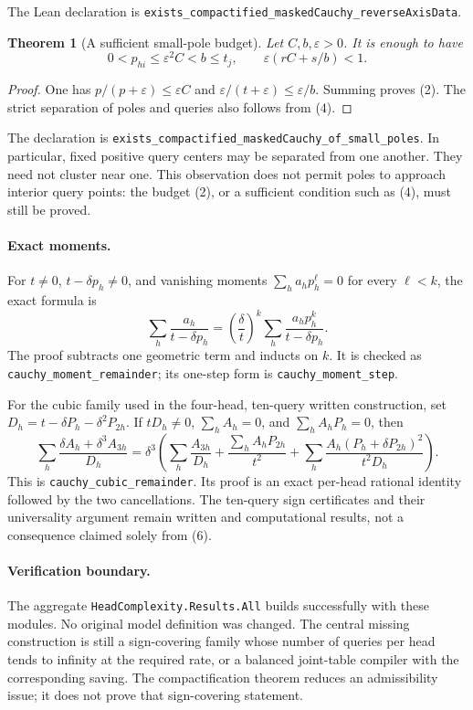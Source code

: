 \documentclass[11pt]{article}
\newtheorem{theorem}{Theorem}
\begin{document}
The Lean declaration is
\texttt{exists\_compactified\_maskedCauchy\_reverseAxisData}.

\begin{theorem}[A sufficient small-pole budget]
Let $C,b,\varepsilon>0$. It is enough to have
\[
 0<p_{hi}\leq\varepsilon^2 C<b\leq t_j,
 \qquad \varepsilon(rC+s/b)<1.
 \tag{4}
\]
\end{theorem}
\begin{proof}
One has $p/(p+\varepsilon)\leq\varepsilon C$ and
$\varepsilon/(t+\varepsilon)\leq\varepsilon/b$.
Summing proves (2). The strict separation of poles and queries also
follows from (4).
\end{proof}
The declaration is
\texttt{exists\_compactified\_maskedCauchy\_of\_small\_poles}.
In particular, fixed positive query centers may be separated from
one another. They need not cluster near one. This observation does
not permit poles to approach interior query points: the budget
(2), or a sufficient condition such as (4), must still be proved.

\paragraph{Exact moments.}
For $t\neq0$, $t-\delta p_h\neq0$, and vanishing moments
$\sum_h a_hp_h^\ell=0$ for every $\ell<k$, the exact formula is
\[
 \sum_h\frac{a_h}{t-\delta p_h}
 =\left(\frac\delta t\right)^k
   \sum_h\frac{a_hp_h^k}{t-\delta p_h}.
 \tag{5}
\]
The proof subtracts one geometric term and inducts on $k$.
It is checked as \texttt{cauchy\_moment\_remainder}; its one-step
form is \texttt{cauchy\_moment\_step}.

For the cubic family used in the four-head, ten-query written
construction, set $D_h=t-\delta P_h-\delta^2P_{2h}$.
If $tD_h\neq0$, $\sum_hA_h=0$, and $\sum_hA_hP_h=0$, then
\[
 \sum_h\frac{\delta A_h+\delta^3 A_{3h}}{D_h}
 =\delta^3\left(
 \sum_h\frac{A_{3h}}{D_h}
 +\frac{\sum_hA_hP_{2h}}{t^2}
 +\sum_h\frac{A_h(P_h+\delta P_{2h})^2}{t^2D_h}
 \right).
 \tag{6}
\]
This is \texttt{cauchy\_cubic\_remainder}. Its proof is an exact
per-head rational identity followed by the two cancellations.
The ten-query sign certificates and their universality argument
remain written and computational results, not a consequence claimed
solely from (6).

\paragraph{Verification boundary.}
The aggregate \texttt{HeadComplexity.Results.All} builds successfully
with these modules. No original model definition was changed.
The central missing construction is still a sign-covering family
whose number of queries per head tends to infinity at the required
rate, or a balanced joint-table compiler with the corresponding
saving. The compactification theorem reduces an admissibility issue;
it does not prove that sign-covering statement.
\end{document}
